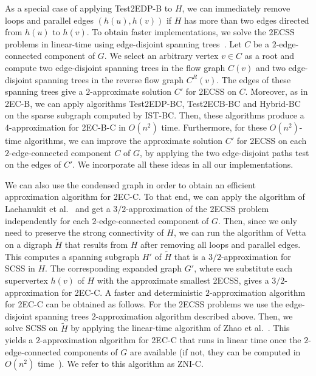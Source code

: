 \documentclass[11pt]{article}
\begin{document}
As a special case of applying \textsf{Test2EDP-B} to $H$, we can immediately remove loops and parallel edges $(h(u),h(v))$ if $H$ has more than two edges directed from $h(u)$ to $h(v)$.
To obtain faster implementations,
we solve the \textsf{2ECSS} problems in linear-time using edge-disjoint spanning trees~\cite{edge-disjoint:edmonds,st:t}.
Let $C$ be a $2$-edge-connected component of $G$. We select an arbitrary vertex $v \in C$ as a root and compute two edge-disjoint spanning trees in the flow graph $C(v)$
and  two edge-disjoint spanning trees in the reverse flow graph $C^R(v)$. The edges of these spanning trees give a $2$-approximate solution $C'$ for \textsf{2ECSS} on $C$.
Moreover, as in \textsf{2EC-B}, we can apply algorithms \textsf{Test2EDP-BC}, \textsf{Test2ECB-BC} and \textsf{Hybrid-BC} on the sparse subgraph computed by \textsf{IST-BC}.
Then, these algorithms produce a $4$-approximation for \textsf{2EC-B-C} in $O(n^2)$ time. Furthermore, for these $O(n^2)$-time algorithms, we can improve the approximate solution $C'$ for \textsf{2ECSS} on each $2$-edge-connected component $C$ of $G$, by applying
the two edge-disjoint paths test on the edges of $C'$.
We incorporate all these ideas in all our implementations.

We can also use the condensed graph in order to obtain an efficient approximation algorithm for \textsf{2EC-C}.
To that end, we can apply the algorithm of Laehanukit et al.~\cite{LGS:MSCS:2012} and get a $3/2$-approximation of the \textsf{2ECSS} problem independently for each $2$-edge-connected component of $G$.
Then, since we only need to preserve the strong connectivity of $H$, we can run the algorithm of Vetta~\cite{Vetta:MSCS:2001} on a digraph $\tilde{H}$ that results from $H$ after removing all loops and parallel edges.
This computes a spanning subgraph $H'$ of $\tilde{H}$ that is a $3/2$-approximation for \textsf{SCSS} in $H$.
The corresponding expanded graph $G'$, where we substitute each supervertex $h(v)$ of $H$ with the approximate smallest \textsf{2ECSS}, gives a $3/2$-approximation for \textsf{2EC-C}.
A faster and deterministic $2$-approximation algorithm for \textsf{2EC-C} can be obtained as follows.
For the \textsf{2ECSS} problems we use the edge-disjoint spanning trees $2$-approximation algorithm described above.
Then, we solve \textsf{SCSS} on $\tilde{H}$ by applying the linear-time algorithm of Zhao et al.~\cite{ZNI:MSCS:2003}.
This yields a $2$-approximation algorithm for \textsf{2EC-C} that runs in linear time once the $2$-edge-connected components of $G$ are available (if not, they can be computed in $O(n^2)$ time~\cite{2CC:HenzingerKL14}).
We refer to this algorithm as \textsf{ZNI-C}.
\end{document}
